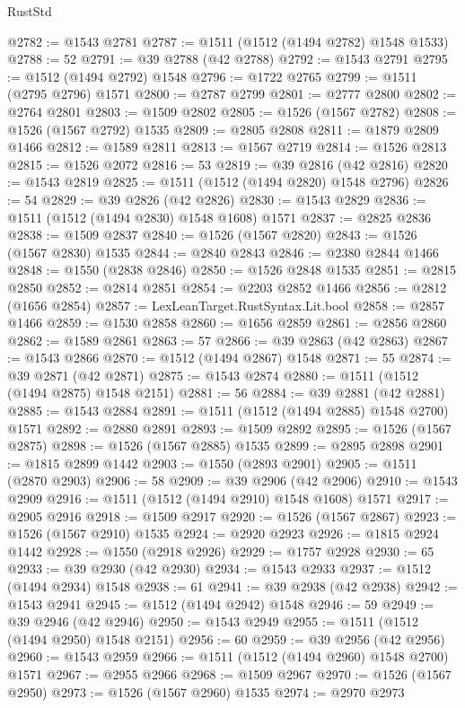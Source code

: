 \begin{lexlean}{RustStd}
\begin{coremodule}
{\begin{coremodule}
{{{{{{{{{{{{{{{{{{{{{{{{{{{{{{{{{{{@2782 := @1543 @2781
@2787 := @1511 (@1512 (@1494 @2782) @1548 @1533)
@2788 := 52
@2791 := @39 @2788 (@42 @2788)
@2792 := @1543 @2791
@2795 := @1512 (@1494 @2792) @1548
@2796 := @1722 @2765
@2799 := @1511 (@2795 @2796) @1571
@2800 := @2787 @2799
@2801 := @2777 @2800
@2802 := @2764 @2801
@2803 := @1509 @2802
@2805 := @1526 (@1567 @2782)
@2808 := @1526 (@1567 @2792) @1535
@2809 := @2805 @2808
@2811 := @1879 @2809 @1466
@2812 := @1589 @2811
@2813 := @1567 @2719
@2814 := @1526 @2813
@2815 := @1526 @2072
@2816 := 53
@2819 := @39 @2816 (@42 @2816)
@2820 := @1543 @2819
@2825 := @1511 (@1512 (@1494 @2820) @1548 @2796)
@2826 := 54
@2829 := @39 @2826 (@42 @2826)
@2830 := @1543 @2829
@2836 := @1511 (@1512 (@1494 @2830) @1548 @1608) @1571
@2837 := @2825 @2836
@2838 := @1509 @2837
@2840 := @1526 (@1567 @2820)
@2843 := @1526 (@1567 @2830) @1535
@2844 := @2840 @2843
@2846 := @2380 @2844 @1466
@2848 := @1550 (@2838 @2846)
@2850 := @1526 @2848 @1535
@2851 := @2815 @2850
@2852 := @2814 @2851
@2854 := @2203 @2852 @1466
@2856 := @2812 (@1656 @2854)
@2857 := LexLeanTarget.RustSyntax.Lit.bool
@2858 := @2857 @1466
@2859 := @1530 @2858
@2860 := @1656 @2859
@2861 := @2856 @2860
@2862 := @1589 @2861
@2863 := 57
@2866 := @39 @2863 (@42 @2863)
@2867 := @1543 @2866
@2870 := @1512 (@1494 @2867) @1548
@2871 := 55
@2874 := @39 @2871 (@42 @2871)
@2875 := @1543 @2874
@2880 := @1511 (@1512 (@1494 @2875) @1548 @2151)
@2881 := 56
@2884 := @39 @2881 (@42 @2881)
@2885 := @1543 @2884
@2891 := @1511 (@1512 (@1494 @2885) @1548 @2700) @1571
@2892 := @2880 @2891
@2893 := @1509 @2892
@2895 := @1526 (@1567 @2875)
@2898 := @1526 (@1567 @2885) @1535
@2899 := @2895 @2898
@2901 := @1815 @2899 @1442
@2903 := @1550 (@2893 @2901)
@2905 := @1511 (@2870 @2903)
@2906 := 58
@2909 := @39 @2906 (@42 @2906)
@2910 := @1543 @2909
@2916 := @1511 (@1512 (@1494 @2910) @1548 @1608) @1571
@2917 := @2905 @2916
@2918 := @1509 @2917
@2920 := @1526 (@1567 @2867)
@2923 := @1526 (@1567 @2910) @1535
@2924 := @2920 @2923
@2926 := @1815 @2924 @1442
@2928 := @1550 (@2918 @2926)
@2929 := @1757 @2928
@2930 := 65
@2933 := @39 @2930 (@42 @2930)
@2934 := @1543 @2933
@2937 := @1512 (@1494 @2934) @1548
@2938 := 61
@2941 := @39 @2938 (@42 @2938)
@2942 := @1543 @2941
@2945 := @1512 (@1494 @2942) @1548
@2946 := 59
@2949 := @39 @2946 (@42 @2946)
@2950 := @1543 @2949
@2955 := @1511 (@1512 (@1494 @2950) @1548 @2151)
@2956 := 60
@2959 := @39 @2956 (@42 @2956)
@2960 := @1543 @2959
@2966 := @1511 (@1512 (@1494 @2960) @1548 @2700) @1571
@2967 := @2955 @2966
@2968 := @1509 @2967
@2970 := @1526 (@1567 @2950)
@2973 := @1526 (@1567 @2960) @1535
@2974 := @2970 @2973
}}}}}}}}}}}}}}}}}}}}}}}}}}}}}}}}}}}
\end{coremodule}}
\end{coremodule}
\end{lexlean}
